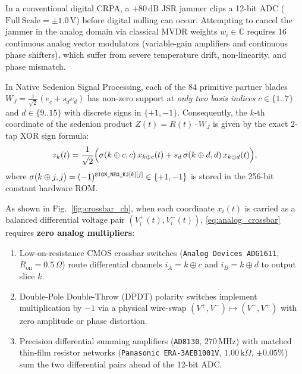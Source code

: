 \documentclass[journal,twoside]{IEEEtran}
\theoremstyle{definition}
\theoremstyle{remark}
\newcommand{\C}{\mathbb{C}}
\begin{document}
In a conventional digital CRPA, a $+80\,\mathrm{dB}$ JSR jammer clips a 12-bit ADC ($\mathrm{Full\ Scale} = \pm 1.0\,\mathrm{V}$) before digital nulling can occur. Attempting to cancel the jammer in the analog domain via classical MVDR weights $w_i \in \C$ requires 16 continuous analog vector modulators (variable-gain amplifiers and continuous phase shifters), which suffer from severe temperature drift, non-linearity, and phase mismatch.

In Native Sedenion Signal Processing, each of the 84 primitive partner blades $W_J = \frac{1}{\sqrt{2}}(e_c + s_d e_d)$ has non-zero support at \emph{only two basis indices} $c \in \{1..7\}$ and $d \in \{9..15\}$ with discrete signs in $\{+1, -1\}$. Consequently, the $k$-th coordinate of the sedenion product $Z(t) = R(t)\cdot W_J$ is given by the exact 2-tap XOR sign formula:
\begin{equation}
    z_k(t) = \frac{1}{\sqrt{2}}\Bigl(\sigma(k\oplus c, c)\, x_{k\oplus c}(t) + s_d\, \sigma(k\oplus d, d)\, x_{k\oplus d}(t)\Bigr),
    \label{eq:analog_crossbar}
\end{equation}
where $\sigma(k\oplus j, j) = (-1)^{\text{\texttt{SIGN\_NEG\_KJ}}[k][j]} \in \{+1, -1\}$ is stored in the 256-bit constant hardware ROM.

As shown in Fig.~\ref{fig:crossbar_ch}, when each coordinate $x_i(t)$ is carried as a balanced differential voltage pair $(V_i^+(t), V_i^-(t))$, \eqref{eq:analog_crossbar} requires \textbf{zero analog multipliers}:
\begin{enumerate}
    \item Low-on-resistance CMOS crossbar switches (\texttt{Analog Devices ADG1611}, $R_{\mathrm{on}} = 0.5\,\Omega$) route differential channels $i_A = k \oplus c$ and $i_B = k \oplus d$ to output slice $k$.
    \item Double-Pole Double-Throw (DPDT) polarity switches implement multiplication by $-1$ via a physical wire-swap $(V^+, V^-) \mapsto (V^-, V^+)$ with zero amplitude or phase distortion.
    \item Precision differential summing amplifiers (\texttt{AD8130}, $270\,\mathrm{MHz}$) with matched thin-film resistor networks (\texttt{Panasonic ERA-3AEB1001V}, $1.00\,\mathrm{k}\Omega$, $\pm 0.05\%$) sum the two differential pairs ahead of the 12-bit ADC.
\end{enumerate}
\end{document}
